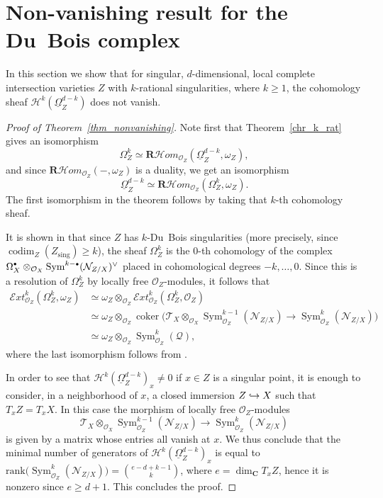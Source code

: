 \documentclass[JEP,XML,SOM,Unicode]{cedram}
\newcommand\hto{\mathrel{\lhook\joinrel\to}}
\newcommand{\sbullet}{{\scriptscriptstyle\bullet}}
\newcommand{\csbullet}{{\raisebox{1pt}{$\sbullet$}}}
\theoremstyle{plain}
\theoremstyle{definition}
\newcommand\R{{\mathbf R}}
\newcommand\C{{\mathbf C}}
\newcommand\cH{\mathcal{H}}
\newcommand\cO{\mathcal{O}}
\newcommand\cH{\mathcal{H}}
\newcommand\cO{\mathcal{O}}
\newcommand\sing{\mathrm{sing}}
\DeclareMathOperator{\codim}{codim}
\DeclareMathOperator{\coker}{coker}
\DeclareMathOperator{\Sym}{Sym}
\begin{document}
\section{Non-vanishing result for the Du~Bois complex}\label{section_nonvanishing}

In this section we show that for singular, $d$-dimensional, local complete intersection varieties $Z$ with $k$-rational singularities, where $k\geq 1$,
the cohomology sheaf $\cH^k(\underline{\Omega}_Z^{d-k})$ does not vanish.

\begin{proof}[Proof of Theorem~\ref{thm_nonvanishing}]
Note first that Theorem~\ref{chr_k_rat} gives an isomorphism
\[\Omega_Z^k\simeq \R\cH om_{\cO_Z}(\underline{\Omega}_Z^{d-k},\omega_Z),\]
and since $\R\cH om_{\cO_Z}(-,\omega_Z)$ is a duality, we get an isomorphism
\[\underline{\Omega}_Z^{d-k}\simeq \R\cH om_{\cO_Z}(\Omega_Z^k,\omega_Z).\]
The first isomorphism in the theorem follows by taking that $k$-th cohomology sheaf.

It is shown in \cite[\S 5.2]{MP1} that since
$Z$ has $k$-Du~Bois singularities (more precisely, since $\codim_Z(Z_\sing)\geq k$), the sheaf $\Omega_Z^k$ is the $0$-th
cohomology of the complex \hbox{$\Omega_X^{\csbullet} \otimes_{\cO_X} \Sym^{k-\sbullet}({\mathcal N}_{Z/X})^{\vee}$} placed in cohomological degrees $-k,\ldots,0$. Since this is a resolution of $\Omega_Z^k$ by locally free $\cO_Z$-modules, it follows that
\begin{align*}
{\mathcal Ext}^k_{\cO_Z}(\Omega_Z^k,\omega_Z)&\simeq \omega_Z\otimes_{\cO_Z}{\mathcal Ext}^k_{\cO_Z}(\Omega_Z^k,\cO_Z)\\
&\simeq\omega_Z\otimes_{\cO_Z} \coker\big({\mathcal T}_X\otimes_{\cO_X}\Sym_{\cO_Z}^{k-1}({\mathcal N}_{Z/X})\to
\Sym_{\cO_Z}^{k}({\mathcal N}_{Z/X})\big)\\
&\simeq \omega_Z\otimes_{\cO_Z}\Sym^k_{\cO_Z}({\mathcal Q}),
\end{align*}
where the last isomorphism follows from \cite[Prop.\,A2.2(d)]{DE}.

In order to see that $\cH^k(\underline{\Omega}_Z^{d-k})_x\neq 0$ if $x\in Z$ is a singular point, it is enough to consider, in a neighborhood of $x$,
a closed immersion $Z\hto X$ such that $T_xZ=T_xX$. In this case the morphism of locally free $\cO_Z$-modules
\[{\mathcal T}_X\otimes_{\cO_X}\Sym_{\cO_Z}^{k-1}({\mathcal N}_{Z/X})\to
\Sym_{\cO_Z}^{k}({\mathcal N}_{Z/X})\]
is given by a matrix whose entries all vanish at $x$. We thus conclude that the minimal number of generators of
$\cH^k(\underline{\Omega}_Z^{d-k})_x$ is equal to $\mathrm{rank}\big(\Sym_{\cO_Z}^k({\mathcal N}_{Z/X})\big)=\binom{e-d+k-1}{k}$,
where $e=\dim_{\C}T_xZ$, hence it is nonzero since $e\geq d+1$. This concludes the proof.
\end{proof}
\end{document}
